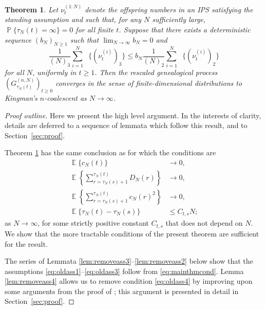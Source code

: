\documentclass{article}
\newtheorem{theorem}{Theorem}
\theoremstyle{definition}
\DeclareMathOperator{\Prob}{\mathbb{P}}
\DeclareMathOperator{\E}{\mathbb{E}}
\DeclareMathOperator{\Et}{\mathbb{E}_t}
\newcommand{\1}[1]{\mathbbm{1}_{\{#1\}}}
\begin{document}
\begin{theorem}\label{thm:generalconv}
Let $\nu_t^{(1:N)}$ denote the offspring numbers in an IPS satisfying the standing assumption and such that, for any $N$ sufficiently large, $\Prob\{ \tau_N(t) = \infty \} =0$ for all finite $t$. Suppose that there exists a deterministic sequence $(b_N)_{N\geq1}$ such that ${\lim}_{N\to\infty} b_N =0$ and
\begin{equation}\label{eq:mainthmcond}
\frac{1}{(N)_3} \sum_{i = 1}^N \Et\{ (\nu_t^{(i)})_3 \}  \leq b_N \frac{1}{(N)_2} \sum_{i = 1}^N \Et\{ (\nu_t^{(i)})_2 \}
\end{equation}
for all $N$, uniformly in $t \geq 1$.
Then the rescaled genealogical process $(G_{\tau_N(t)}^{(n,N)})_{t\geq0}$ converges in the sense of finite-dimensional distributions to Kingman's $n$-coalescent as $N \to \infty$.
\end{theorem}

\begin{proof}[Proof outline]
Here we present the high level argument. In the interests of clarity, details are deferred to a sequence of lemmata which follow this result, and to Section~\ref{sec:proof}.

Theorem \ref{thm:generalconv} has the same conclusion as \citet[Theorem 1]{koskela2018} for which the conditions are
\begin{align}
\E \{c_N(t)\} &\rightarrow 0 , \label{eq:oldass1}\\
\E \left\{ \sum_{ r = \tau_N( s ) + 1 }^{ \tau_N( t ) } D_N( r ) \right\} &\rightarrow 0, \label{eq:oldass2}\\
\E \left\{ \sum_{ r = \tau_N( s ) + 1 }^{ \tau_N( t ) } c_N( r )^2 \right\} &\rightarrow 0 , \label{eq:oldass3}\\
\E \{\tau_N(t) - \tau_N(s)\} &\leq C_{t,s} N; \label{eq:oldass4}
\end{align}
as $N\to\infty$, for some strictly positive constant $C_{t,s}$ that does not depend on $N$. We show that the more tractable conditions of the present theorem are sufficient for the result.

The series of Lemmata \ref{lem:removeass3}--\ref{lem:removeass2} below show that the assumptions \eqref{eq:oldass1}--\eqref{eq:oldass3} follow from \eqref{eq:mainthmcond}. Lemma \ref{lem:removeass4} allows us to remove condition \eqref{eq:oldass4} by improving upon some arguments from the proof of \citet[Theorem 1]{koskela2018}; this argument is presented in detail in Section~\ref{sec:proof}.
\end{proof}
\end{document}
